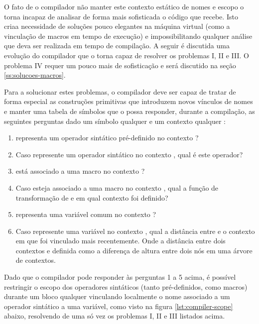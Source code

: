 O fato de o compilador não manter este contexto estático de nomes e escopo o
torna incapaz de analisar de forma mais sofisticada o código que recebe.
Isto criaa necessidade de soluções pouco elegantes na máquina virtual (como a
vinculação de macros em tempo de execução) e impossibilitando qualquer análise
que deva ser realizada em tempo de compilação. A seguir é
discutida uma evolução do compilador que o torna capaz de resolver os problemas
I, II e III. O problema IV requer um pouco mais de sofisticação e será
discutido na seção \ref{ss:solucoes-macros}.

Para a solucionar estes problemas, o compilador deve ser capaz de tratar de
forma especial as construções primitivas que introduzem novos vínculos de nomes
e manter uma tabela de símbolos que o possa responder, durante a compilação,
as seguintes perguntas dado um símbolo qualquer  e um
contexto qualquer :

\begin{enumerate}
 \item {} representa um operador sintático pré-definido no contexto ? 

 \item Caso  represente um operador sintático no contexto ,
qual é este operador?

 \item {} está associado a uma macro no contexto ? 
 
 \item Caso  esteja associado a uma macro no contexto , qual a
função de transformação de  e em qual contexto  foi definido?

 \item {} representa uma variável comum no contexto ? 

 \item Caso  represente uma variável no contexto , qual a
distância entre  e o contexto em que  foi vinculado mais
recentemente. Onde a distância entre dois contextos  e 
definida como a diferença de altura entre dois nós em uma árvore de contextos.

\end{enumerate}

Dado que o compilador pode responder às perguntas 1 a 5 acima, é possível
restringir o escopo dos operadores sintáticos (tanto pré-definidos, como
macros) durante um bloco qualquer vinculando localmente o nome associado a um
operador sintático a uma variável, como visto na figura \ref{lst:compiler-scope}
abaixo, resolvendo de uma só vez os problemas I, II e III listados acima.

